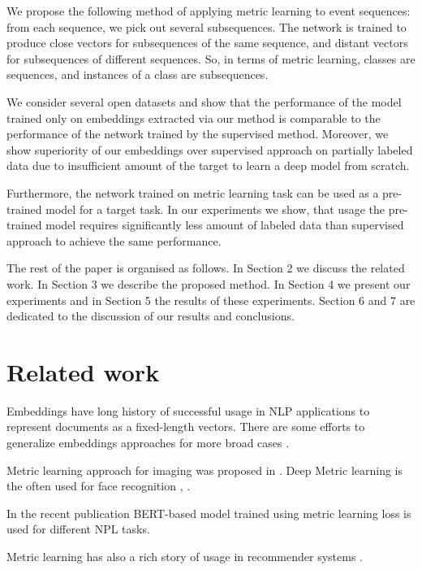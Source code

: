 \documentclass[sigconf]{acmart}
\begin{document}
We propose the following method of applying metric learning to event sequences: from each sequence, we pick out several subsequences. The network is trained to produce close vectors for subsequences of the same sequence, and distant vectors for subsequences of different sequences. So, in terms of metric learning, classes are sequences, and instances of a class are subsequences.

We consider several open datasets and show that the performance of the model trained only on embeddings extracted via our method is comparable to the performance of the network trained by the supervised method.
Moreover, we show superiority of our embeddings over supervised approach on partially labeled data due to insufficient amount of the target to learn a deep model from scratch.

Furthermore, the network trained on metric learning task can be used as a pre-trained model for a target task. In our experiments we show, that usage the pre-trained model requires significantly less amount of labeled data than supervised approach to achieve the same performance.

The rest of the paper is organised as follows. In Section 2 we discuss the related work. In Section 3 we describe the proposed method. In Section 4 we present our experiments and in Section 5 the results of these experiments. Section 6 and 7 are dedicated to the discussion of our results and conclusions.

\section{Related work} \label{sec-rw}

Embeddings have long history of successful usage in NLP applications to represent documents as a fixed-length vectors. There are some efforts to generalize embeddings approaches for more broad cases \cite{Wu2017StarSpaceEA}.

Metric learning approach for imaging was proposed in \cite{Hadsell:2006:DRL:1153171.1153654}.
Deep Metric learning is the often used for face recognition \cite{Schroff2015FaceNetAU}, \cite{kaya2019deep}.

In the recent publication \cite{reimers-2019-sentence-bert} BERT-based model \cite{Devlin2019BERTPO} trained using metric learning loss is used for different NPL tasks.

Metric learning has also a rich story of usage in recommender systems \cite{Hsieh:2017:CML:3038912.3052639}.
\end{document}
